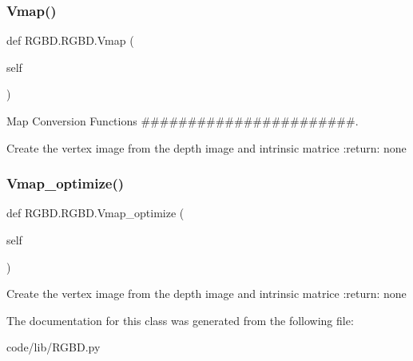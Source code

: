 \subsubsection{\texorpdfstring{Vmap()}{Vmap()}}
{\footnotesize\ttfamily def R\+G\+B\+D.\+R\+G\+B\+D.\+Vmap (\begin{DoxyParamCaption}\item[{}]{self }\end{DoxyParamCaption})}



Map Conversion Functions \#\#\#\#\#\#\#\#\#\#\#\#\#\#\#\#\#\#\#\#\#\#\#. 

\begin{DoxyVerb}Create the vertex image from the depth image and intrinsic matrice
:return: none
\end{DoxyVerb}
 \mbox{\label{class_r_g_b_d_1_1_r_g_b_d_a2686c0b37c9c4cf8a650656680402797}} 
\subsubsection{\texorpdfstring{Vmap\+\_\+optimize()}{Vmap\_optimize()}}
{\footnotesize\ttfamily def R\+G\+B\+D.\+R\+G\+B\+D.\+Vmap\+\_\+optimize (\begin{DoxyParamCaption}\item[{}]{self }\end{DoxyParamCaption})}

\begin{DoxyVerb}Create the vertex image from the depth image and intrinsic matrice
:return: none
\end{DoxyVerb}
 

The documentation for this class was generated from the following file\+:\begin{DoxyCompactItemize}
\item 
code/lib/R\+G\+B\+D.\+py\end{DoxyCompactItemize}
